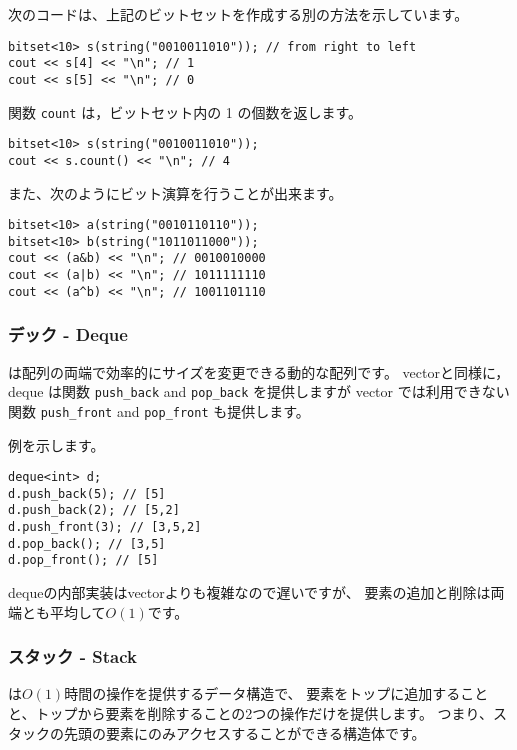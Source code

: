 次のコードは、上記のビットセットを作成する別の方法を示しています。

\begin{lstlisting}
bitset<10> s(string("0010011010")); // from right to left
cout << s[4] << "\n"; // 1
cout << s[5] << "\n"; // 0
\end{lstlisting}

関数 \texttt{count} は，ビットセット内の 1 の個数を返します。

\begin{lstlisting}
bitset<10> s(string("0010011010"));
cout << s.count() << "\n"; // 4
\end{lstlisting}

また、次のようにビット演算を行うことが出来ます。

\begin{lstlisting}
bitset<10> a(string("0010110110"));
bitset<10> b(string("1011011000"));
cout << (a&b) << "\n"; // 0010010000
cout << (a|b) << "\n"; // 1011111110
cout << (a^b) << "\n"; // 1001101110
\end{lstlisting}

\subsubsection{デック - Deque}


 は配列の両端で効率的にサイズを変更できる動的な配列です。
vectorと同様に，deque は関数 \texttt{push\_back} and \texttt{pop\_back} を提供しますが
vector では利用できない関数 \texttt{push\_front} and \texttt{pop\_front} も提供します。

例を示します。
\begin{lstlisting}
deque<int> d;
d.push_back(5); // [5]
d.push_back(2); // [5,2]
d.push_front(3); // [3,5,2]
d.pop_back(); // [3,5]
d.pop_front(); // [5]
\end{lstlisting}

dequeの内部実装はvectorよりも複雑なので遅いですが、
要素の追加と削除は両端とも平均して$O(1)$です。

\subsubsection{スタック - Stack}


は$O(1)$時間の操作を提供するデータ構造で、
要素をトップに追加することと、トップから要素を削除することの2つの操作だけを提供します。
つまり、スタックの先頭の要素にのみアクセスすることができる構造体です。

